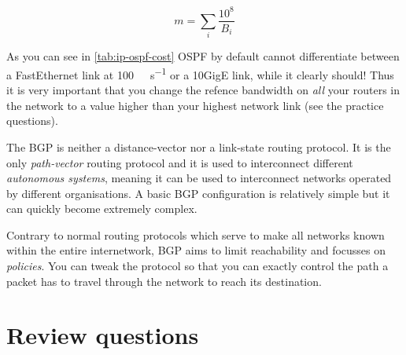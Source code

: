 \begin{equation}
m = \sum_i\frac{10^8}{B_i}
\end{equation}

As you can see in \vref{tab:ip-ospf-cost} \acs{OSPF} by default cannot differentiate between a FastEthernet link at \SI{100}{\mega\bit\per\second} or a 10GigE link, while it clearly should!
Thus it is very important that you change the refence bandwidth on \emph{all} your routers in the network to a value higher than your highest network link (see the practice questions).


The \acl{BGP} is neither a distance-vector nor a link-state routing protocol.
It is the only \emph{path-vector} routing protocol and it is used to interconnect different \emph{autonomous systems}, meaning it can be used to interconnect networks operated by different organisations.
A basic \acs{BGP} configuration is relatively simple but it can quickly become extremely complex.

Contrary to normal routing protocols which serve to make all networks known within the entire internetwork, \acs{BGP} aims to limit reachability and focusses on \emph{policies}.
You can tweak the protocol so that you can exactly control the path a packet has to travel through the network to reach its destination.



\section{Review questions}
\label{sec:ip-review-questions}

